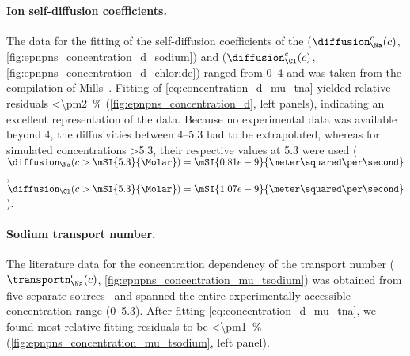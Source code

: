 \paragraph{Ion self-diffusion coefficients.}
%
The data for the fitting of the self-diffusion coefficients of the \Na{} ($\diffusion_{\Na}^c (c)$,
\cref{fig:epnpns_concentration_d_sodium}) and \Cl{} ($\diffusion_{\Cl}^c (c)$,
\cref{fig:epnpns_concentration_d_chloride}) ranged from \SIrange{0}{4}{\Molar} and was taken from the
compilation of Mills~\cite{Mills-1989}. Fitting of \cref{eq:concentration_d_mu_tna} yielded relative residuals
\SI{<\pm2}{\percent} (\cref{fig:epnpns_concentration_d}, left panels), indicating an excellent representation of
the data. Because no experimental data was available beyond \SI{4}{\Molar}, the diffusivities between
\SIrange{4}{5.3}{\Molar} had to be extrapolated, whereas for simulated concentrations \SI{>5.3}{\Molar}, their
respective values at \SI{5.3}{\Molar} were used (\ie~$\diffusion_{\Na} (c > \mSI{5.3}{\Molar}) =
\mSI{0.81e-9}{\meter\squared\per\second}$, $\diffusion_{\Cl} (c > \mSI{5.3}{\Molar}) =
\mSI{1.07e-9}{\meter\squared\per\second}$).

\paragraph{Sodium transport number.}
%
The literature data for the concentration dependency of the \Na{} transport number ($\transportn_{\Na}^c (c)$,
\cref{fig:epnpns_concentration_mu_tsodium}) was obtained from five separate
sources~\cite{Esteso-1976,Haynes-2017,DellaMonica-1979,Panopoulos-1986,Schonert-2013} and spanned the entire
experimentally accessible  concentration range (\SIrange{0}{5.3}{\Molar}). After fitting
\cref{eq:concentration_d_mu_tna}, we found most relative fitting residuals to be \SI{<\pm1}{\percent}
(\cref{fig:epnpns_concentration_mu_tsodium}, left panel).

